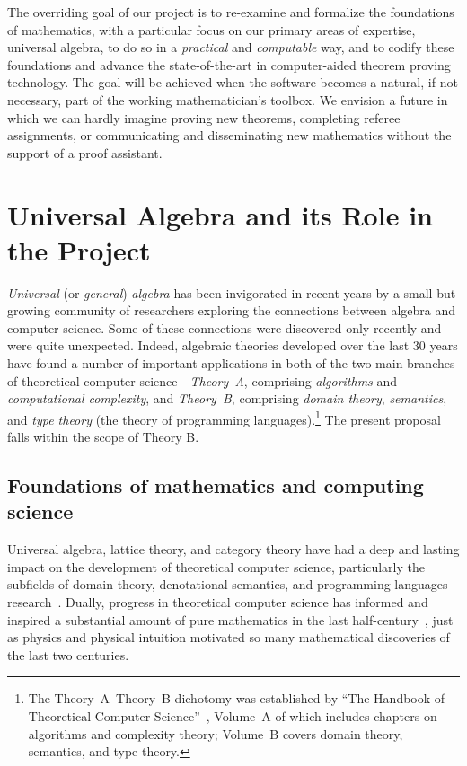 \documentclass[11pt]{amsart}  %
\begin{document}
The overriding goal of our project is to re-examine and formalize the foundations of 
mathematics, with a particular focus on our primary areas of expertise, universal algebra, to do so in a \emph{practical} and \emph{computable} way, and to codify these foundations and advance the state-of-the-art in computer-aided theorem proving technology. The goal will be achieved when the software becomes a natural, if not necessary, part of the working mathematician's toolbox.  We envision a future in which we can hardly imagine proving new theorems, completing referee assignments, or communicating and disseminating new mathematics without the support of a proof assistant.


\section{Universal Algebra and its Role in the Project}
\emph{Universal} (or \emph{general}) \emph{algebra} has been invigorated in recent years by a small but growing community of researchers exploring the connections between algebra and computer science. Some of these connections were discovered only recently and were quite unexpected. Indeed, algebraic theories developed over the last 30 years have found a number of important applications in both of the two main branches of theoretical computer science---\emph{Theory~A}, comprising \emph{algorithms} and \emph{computational complexity}, and \emph{Theory~B}, comprising \emph{domain theory}, \emph{semantics}, and \emph{type theory} (the theory of programming languages).\footnote{The Theory~A--Theory~B dichotomy was established by ``The Handbook of Theoretical Computer Science''~\cite{vanLeeuwen:1991A,vanLeeuwen:1991B}, Volume~A of which includes chapters on algorithms and complexity theory; Volume~B covers domain theory, semantics, and type theory.}
The present proposal falls within the scope of Theory B.

\subsection{Foundations of mathematics and computing science}
Universal algebra, lattice theory, and category theory have had a deep and lasting impact on the development of theoretical computer science,  particularly the subfields of domain theory, denotational semantics, and programming languages research~\cite{MR1249550}. Dually, progress in theoretical computer science has informed and inspired a substantial amount of pure mathematics in the last half-century~\cite{MR3662915,MR3725758,MR2765040,MR3233442,MR1321662, MR1249550}, %
just as physics and physical intuition motivated so many mathematical discoveries of the last two centuries.
\end{document}
